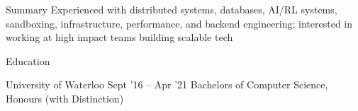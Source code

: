 \documentclass{resume} %
\begin{document}

\begin{rSection}{Summary}
  \vspace {0.1em}
  Experienced with distributed systems, databases, AI/RL systems, sandboxing, infrastructure, performance, and backend engineering; interested in working at high impact teams building scalable tech
  \vspace{0.05em}
\end{rSection}


\begin{rSection}{Education}
  \begin{rEducationSection}{University of Waterloo}
		     {Sept '16 -- Apr '21}
		     {Bachelors of Computer Science, Honours
             (with Distinction)}
  \end{rEducationSection}
\end{rSection} 

\end{document}
